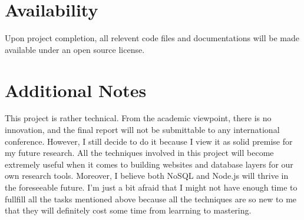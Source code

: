 \documentclass[10pt, conference, compsocconf]{IEEEtran}
\begin{document}
\section{Availability}

Upon project completion, all relevent code files and documentations will be made available under an open source license.

\section{Additional Notes}

This project is rather technical. From the academic viewpoint, there is no innovation, and the final report will not be submittable to any international conference. However, I still decide to do it because I view it as solid premise for my future research. All the techniques involved in this project will become extremely useful when it comes to building websites and database layers for our own research tools. Moreover, I believe both NoSQL and Node.js will thrive in the foreseeable future. I'm just a bit afraid that I might not have enough time to fullfill all the tasks mentioned above because all the techniques are so new to me that they will definitely cost some time from learrning to mastering.






\end{document}
